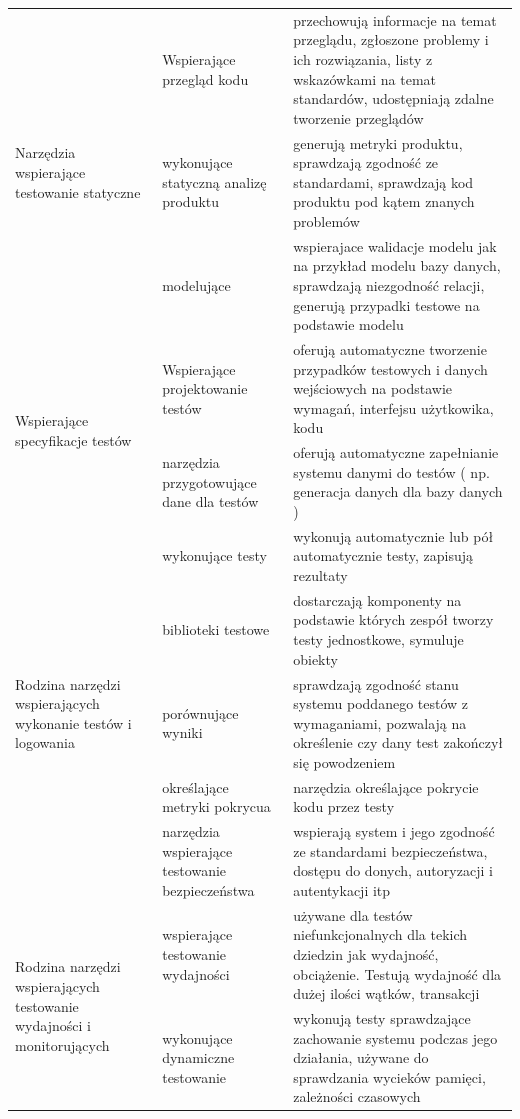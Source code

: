 \begin{longtable}{| p{4cm} | p{4cm} | p{8cm} |}
\multirow{3}{4cm}{Narzędzia wspierające testowanie statyczne} &
Wspierające przegląd kodu & przechowują informacje na temat przeglądu, zgłoszone problemy i ich rozwiązania, listy z wskazówkami na temat standardów, udostępniają zdalne tworzenie przeglądów\\ \cline{2-3}
& wykonujące statyczną analizę produktu & generują metryki produktu, sprawdzają zgodność ze standardami, sprawdzają kod produktu pod kątem znanych problemów\\ \cline{2-3}
&  modelujące  & wspierajace walidacje modelu jak na przykład modelu bazy danych, sprawdzają niezgodność relacji, generują przypadki testowe na podstawie modelu\\ \hline
\hline
\multirow{2}{4cm}{Wspierające specyfikacje testów} &
Wspierające projektowanie testów & oferują automatyczne tworzenie przypadków testowych i danych wejściowych na podstawie wymagań, interfejsu użytkowika, kodu\\ \cline{2-3}
& narzędzia przygotowujące dane dla testów & oferują automatyczne zapełnianie systemu danymi do testów ( np. generacja danych dla bazy danych )\\ \cline{2-3}
\hline
\multirow{5}{4cm}{Rodzina narzędzi wspierających wykonanie testów i logowania} &
wykonujące testy & wykonują automatycznie lub pół automatycznie testy, zapisują rezultaty\\ \cline{2-3}
& biblioteki testowe & dostarczają komponenty na podstawie których zespół tworzy testy jednostkowe, symuluje obiekty\\ \cline{2-3}
&  porównujące wyniki & sprawdzają zgodność stanu systemu poddanego testów z wymaganiami, pozwalają na określenie czy dany test zakończył się powodzeniem\\ \cline{2-3}
& określające metryki pokrycua & narzędzia określające pokrycie kodu przez testy \\ \cline{2-3}
& narzędzia wspierające testowanie bezpieczeństwa & wspierają system i jego zgodność ze standardami bezpieczeństwa, dostępu do donych, autoryzacji i autentykacji itp\\ \hline
\hline
\multirow{5}{4cm}{Rodzina narzędzi wspierających testowanie wydajności i monitorujących}&
 wspierające testowanie wydajności & używane dla testów niefunkcjonalnych dla tekich dziedzin jak wydajność, obciążenie. Testują wydajność dla dużej ilości wątków, transakcji \\ \cline{2-3}
& wykonujące dynamiczne testowanie & wykonują testy sprawdzające zachowanie systemu podczas jego działania, używane do sprawdzania wycieków pamięci, zależności czasowych \\ \cline{2-3}

\end{longtable}
